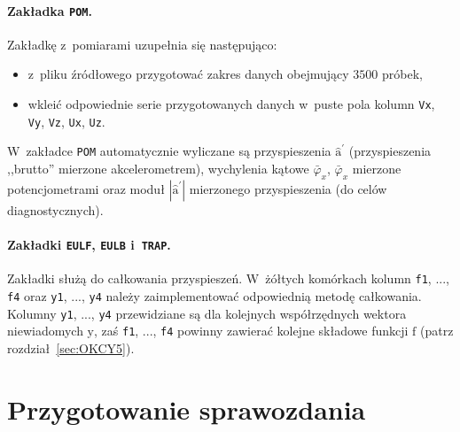 \documentclass[paper=a4,DIV=12]{lpas}
\newcommand{\brm}[1]{\bm{\mathrm{#1}}}
\begin{document}
\paragraph{Zakładka \texttt{POM}.} Zakładkę z~pomiarami uzupełnia się
następująco:
\begin{itemize}
  \item z~pliku źródłowego przygotować zakres danych obejmujący $3500$ próbek,
  \item wkleić odpowiednie serie przygotowanych danych w~puste pola kolumn
    \texttt{Vx}, \texttt{Vy}, \texttt{Vz}, \texttt{Ux}, \texttt{Uz}.
\end{itemize}
W~zakładce \texttt{POM} automatycznie wyliczane są przyspieszenia
$\hat{\brm{a}}^{\prime}$ (przyspieszenia ,,brutto'' mierzone akcelerometrem),
wychylenia kątowe $\bar{\varphi}_x$, $\bar{\varphi}_x$ mierzone potencjometrami
oraz moduł $\left|\hat{\brm{a}}^{\prime}\right|$ mierzonego przyspieszenia
(do celów diagnostycznych).

\paragraph{Zakładki \texttt{EULF}, \texttt{EULB} i~\texttt{TRAP}.} Zakładki
służą do całkowania przyspieszeń. W~żółtych komórkach kolumn \texttt{f1}, ...,
\texttt{f4} oraz \texttt{y1}, ..., \texttt{y4} należy zaimplementować
odpowiednią metodę całkowania. Kolumny \texttt{y1}, ..., \texttt{y4}
przewidziane są dla kolejnych współrzędnych wektora niewiadomych $\brm{y}$, zaś
\texttt{f1}, ..., \texttt{f4} powinny zawierać kolejne składowe funkcji
$\brm{f}$ (patrz rozdział~\ref{sec:OKCY5}).

\section{Przygotowanie sprawozdania}
\label{sec:GO0AP}
\end{document}
